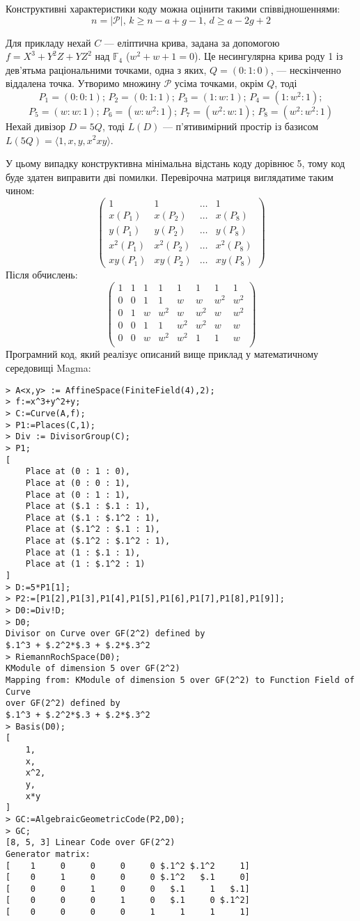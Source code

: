 \documentclass[a4paper,12pt,oneside]{article}
\begin{document}
Конструктивні характеристики коду можна оцінити такими співвідношеннями:
$$n=|\mathcal{P}|, \, k \ge n-a+g-1, \, d \ge a-2g+2$$

Для прикладу нехай $C$ --- еліптична крива, задана за допомогою $f=X^3+Y^2Z+YZ^2$ над $\mathbb{F}_4$ ($w^2+w+1=0$). 
Це несингулярна крива роду 1 із дев'ятьма раціональними точками, одна з яких, $Q=(0:1:0)$, --- нескінченно віддалена точка. 
Утворимо множину $\mathcal{P}$ усіма точками, окрім $Q$, тоді
$$P_1 = (0 : 0 : 1); \, P_2 = (0 : 1 : 1); \, P_3 = (1 : w : 1); \, P_4 = (1 : w^2 : 1);$$ 
$$P_5 = (w : w : 1); \, P_6 = (w : w^2 : 1); \, P_7 = (w^2 : w : 1); \, P_8 = (w^2 : w^2 : 1)$$
Нехай дивізор $D=5Q$, тоді $L(D)$ --- п'ятивимірний простір із базисом $L(5Q) = \langle 1, x, y, x^2 xy \rangle$.

У цьому випадку конструктивна мінімальна відстань коду дорівнює 5, тому код буде здатен виправити дві помилки.
Перевірочна матриця виглядатиме таким чином:
$$
\begin{pmatrix}
1 & 1 & \dots & 1 \\
x(P_1) & x(P_2) & \dots & x(P_8) \\
y(P_1) & y(P_2) & \dots & y(P_8) \\
x^2(P_1) & x^2(P_2) & \dots & x^2(P_8) \\
xy(P_1) & xy(P_2) & \dots & xy(P_8)
\end{pmatrix}
$$
Після обчислень:
$$
\begin{pmatrix}
1 & 1 & 1 & 1 & 1 & 1 & 1 & 1 \\
0 & 0 & 1 & 1 & w & w & w^2 & w^2 \\
0 & 1 & w & w^2 & w & w^2 & w & w^2 \\
0 & 0 & 1 & 1 & w^2 & w^2 & w & w \\
0 & 0 & w & w^2 & w^2 & 1 & 1 & w \\
\end{pmatrix}
$$
Програмний код, який реалізує описаний вище приклад у математичному середовищі Magma:
\begin{verbatim}
> A<x,y> := AffineSpace(FiniteField(4),2);
> f:=x^3+y^2+y;
> C:=Curve(A,f);
> P1:=Places(C,1);
> Div := DivisorGroup(C);
> P1;
[
    Place at (0 : 1 : 0),
    Place at (0 : 0 : 1),
    Place at (0 : 1 : 1),
    Place at ($.1 : $.1 : 1),
    Place at ($.1 : $.1^2 : 1),
    Place at ($.1^2 : $.1 : 1),
    Place at ($.1^2 : $.1^2 : 1),
    Place at (1 : $.1 : 1),
    Place at (1 : $.1^2 : 1)
]
> D:=5*P1[1];
> P2:=[P1[2],P1[3],P1[4],P1[5],P1[6],P1[7],P1[8],P1[9]];
> D0:=Div!D;
> D0;
Divisor on Curve over GF(2^2) defined by
$.1^3 + $.2^2*$.3 + $.2*$.3^2
> RiemannRochSpace(D0);
KModule of dimension 5 over GF(2^2)
Mapping from: KModule of dimension 5 over GF(2^2) to Function Field of Curve 
over GF(2^2) defined by
$.1^3 + $.2^2*$.3 + $.2*$.3^2
> Basis(D0);
[
    1,
    x,
    x^2,
    y,
    x*y
]
> GC:=AlgebraicGeometricCode(P2,D0);
> GC;
[8, 5, 3] Linear Code over GF(2^2)
Generator matrix:
[    1     0     0     0     0 $.1^2 $.1^2     1]
[    0     1     0     0     0 $.1^2   $.1     0]
[    0     0     1     0     0   $.1     1   $.1]
[    0     0     0     1     0   $.1     0 $.1^2]
[    0     0     0     0     1     1     1     1]
\end{verbatim}
\end{document}
